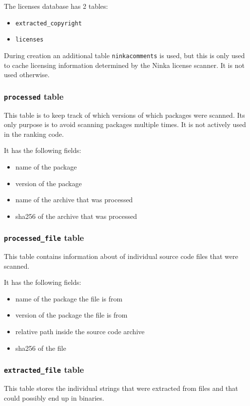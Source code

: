 \documentclass[10pt]{article}
\begin{document}
The licenses database has 2 tables:

\begin{itemize}
\item \texttt{extracted\_copyright}
\item \texttt{licenses}
\end{itemize}

During creation an additional table \texttt{ninkacomments} is used, but this
is only used to cache licensing information determined by the Ninka license
scanner. It is not used otherwise.

\subsubsection{\texttt{processed} table}

This table is to keep track of which versions of which packages were scanned.
Its only purpose is to avoid scanning packages multiple times. It is not
actively used in the ranking code.

It has the following fields:

\begin{itemize}
\item name of the package
\item version of the package
\item name of the archive that was processed
\item sha256 of the archive that was processed
\end{itemize}

\subsubsection{\texttt{processed\_file} table}
This table contains information about of individual source code files that were
scanned.

It has the following fields:

\begin{itemize}
\item name of the package the file is from
\item version of the package the file is from
\item relative path inside the source code archive
\item sha256 of the file
\end{itemize}

\subsubsection{\texttt{extracted\_file} table}
This table stores the individual strings that were extracted from files and
that could possibly end up in binaries.
\end{document}
